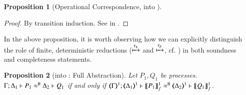\documentclass[preprint,11pt]{elsarticle}
\newtheorem{proposition}{Proposition}[section]
\begin{document}
{%
%
%
%		    


\begin{proposition}[Operational Correspondence, \HOp into \HO]\rm
	\label{prop:op_corr_HOp_to_HO}

\end{proposition}


\begin{proof}
By transition induction. See  in .
\end{proof}

In the above proposition, it is worth
observing how we can explicitly distinguish the role of finite, deterministic reductions 
($\xmapsto{\tau_{\mathsf{s}}}$ and $\xmapsto{\tau_{\beta}}$, cf. ) in both soundness and completeness statements.

\begin{proposition}[\HOp into \HO: Full Abstraction]%
	\label{prop:fulla_HOp_to_HO}
	Let $P_1, Q_1$ be \HOp processes. \\
	$\Gamma; \Delta_1 \vdash P_1 \approx^\mathtt{H} \Delta_2 \vdash Q_1$
	if and only if
	$\horel{\tmap{\Gamma}{1}}{\tmap{\Delta_1}{1}}{\pmapp{P_1}{1}{f}}{\hwb}{\tmap{\Delta_2}{1}}{\pmapp{Q_1}{1}{f}}$.
\end{proposition}

}
\end{document}
